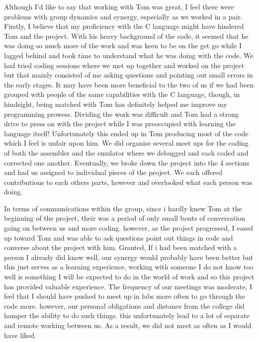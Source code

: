 \documentclass[11pt]{article}
\begin{document}
Although I'd like to say that working with Tom was great, I feel there were problems with group dynamics and synergy, especially as we worked in a pair. Firstly, I believe that my proficiency with the C language might have hindered Tom and the project. With his heavy background of the code, it seemed that he was doing so much more of the work and was keen to be on the get go while I lagged behind and took time to understand what he was doing with the code. We had tried coding sessions where we met up together and worked on the project but that mainly consisted of me asking questions and pointing out small errors in the early stages. It may have been more beneficial to the two of us if we had been grouped with people of the same capabilities with the C language, though, in hindsight, being matched with Tom has definitely helped me improve my programming prowess. Dividing the work was difficult and Tom had a strong drive to press on with the project while I was preoccupied with learning the language itself! Unfortunately this ended up in Tom producing most of the code which I feel is unfair upon him. We did organise several meet ups for the coding of both the assembler and the emulator where we debugged and each coded  and corrected one another. Eventually, we broke down the project into the 4 sections and had us assigned to individual pieces of the project. We each offered contributions to each others parts, however and overlooked what each person was doing.

In terms of communications within the group, since i hardly knew Tom at the beginning of the project, their was a period of only small bouts of conversation going on between us and more coding. however, as the project progressed, I eased up toward Tom and was able to ask questions point out things in code and converse about the project with him. Granted, If i had been matched with a person I already did know well, our synergy would probably have been better but this just serves as a learning experience, working with someone I do not know too well is something I will be expected to do in the world of work and so this project has provided valuable experience. The frequency of our meetings was moderate, I feel that I should have pushed to meet up in labs more often to go through the code more. however, our personal obligations and distance from the college did hamper the ability to do such things. this unfortunately lead to a lot of separate and remote working between us. As a result, we did not meet as often as I would have liked.
\end{document}
